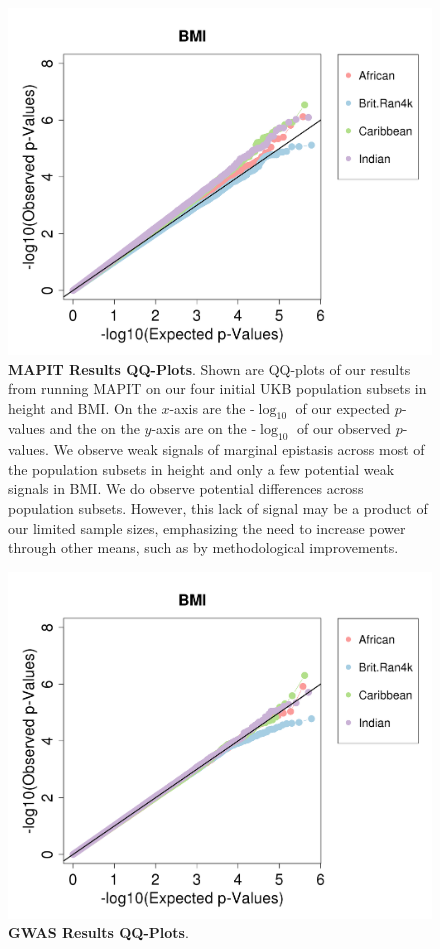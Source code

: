 \documentclass[12pt, a4paper]{article}
\begin{document}
\begin{figure}[htbp]
\centering
\includegraphics[scale=.35]{Images/Supp/InterPath_Supp_Figure_MAPIT_vs3_BMI.png}
\caption[TBD]{\textbf{MAPIT Results QQ-Plots}. Shown are QQ-plots of our results from running MAPIT on our four initial UKB population subsets in height and BMI. On the $x$-axis are the -$\log_{10}$ of our expected $p$-values and the on the $y$-axis are on the -$\log_{10}$ of our observed $p$-values. We observe weak signals of marginal epistasis across most of the population subsets in height and only a few potential weak signals in BMI. We do observe potential differences across population subsets. However, this lack of signal may be a product of our limited sample sizes, emphasizing the need to increase power through other means, such as by methodological improvements.}
\label{InterPath-Supp-Figure-MAPIT-BMI}
\end{figure}

\begin{figure}[htbp]
\centering
\includegraphics[scale=.35]{Images/Supp/InterPath_Supp_Figure_GWAS_vs2_BMI.png}
\caption[TBD]{\textbf{GWAS Results QQ-Plots}.}
\label{InterPath-Supp-Figure-GWAS-BMI}
\end{figure}
\end{document}
